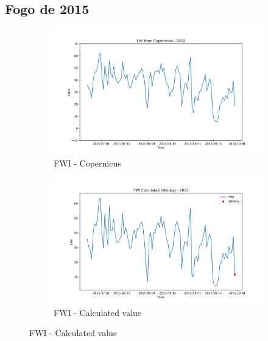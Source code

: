 \subsection{Fogo de 2015}
\begin{figure}[h]
\caption{Comparison of FWI calculated values and Copernicus at midday}
    \centering
    \begin{subfigure}{0.49\textwidth}
        \centering
        \includegraphics[width=\textwidth]{graphs/2015/2015CopernicusFWI12.png}
        \caption{FWI - Copernicus}
        \label{fig:fwi_copernicus_2015_midday}
    \end{subfigure}
    \hfill
    \begin{subfigure}{0.49\textwidth}
        \centering
        \includegraphics[width=\textwidth]{graphs/2015/2015CalcFWI12.png}
        \caption{FWI - Calculated value}
        \label{fig:fwi_calculated_2015_midday}
    \end{subfigure}
    \label{fig:comparison_fwi_midday_copernicus_calculated}
\end{figure}


